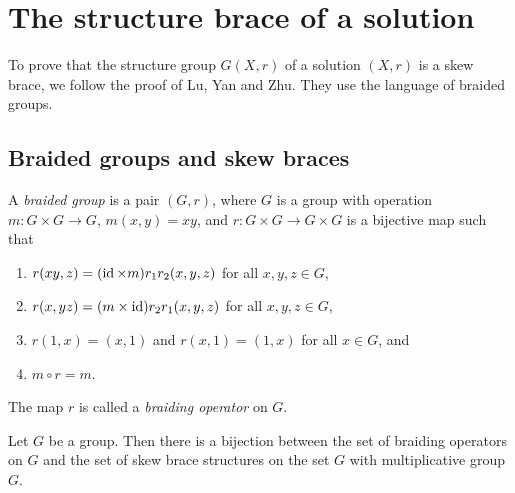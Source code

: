 \chapter{The structure brace of a solution}
\label{structure_brace}


To prove that the structure group $G(X,r)$ of a solution $(X,r)$ is a skew brace, we follow the 
proof of Lu, Yan and Zhu. They use the language of braided groups.

\section{Braided groups and skew braces}

\begin{definition}
A \emph{braided group} is a pair $(G,r)$, where 
$G$ is a group with operation $m\colon G\times G\to G$, $m(x,y)=xy$, and 
$r\colon G\times G\to G\times G$ is a bijective map such that
\begin{enumerate}
\item $r(xy,z)=(\operatorname{id}\times m)r_1r_2(x,y,z)$ for all $x,y,z\in G$,
\item $r(x,yz)=(m\times\operatorname{id})r_2r_1(x,y,z)$ for all $x,y,z\in G$,
\item $r(1,x)=(x,1)$ and $r(x,1)=(1,x)$ for all $x\in G$, and 
\item $m\circ r=m$.
\end{enumerate}
The map $r$ is called a \emph{braiding operator} on $G$. 
\end{definition}


\begin{theorem}
    Let $G$ be a group. Then there is a bijection between the set of braiding operators on $G$ and the set of skew brace structures on the set $G$ with multiplicative group $G$. 
\end{theorem}

